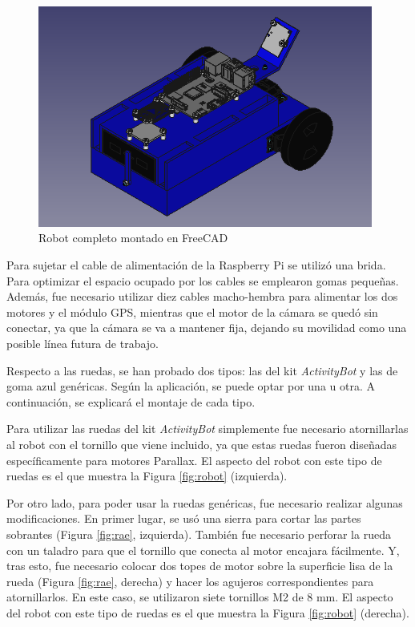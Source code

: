 \begin{figure} [h!]
	\begin{center}
		\includegraphics[width=11cm]{figs/cap5/completo3.png}
	\end{center}
	\caption{Robot completo montado en FreeCAD} 
	\label{fig:robotfreecad}
\end{figure}


Para sujetar el cable de alimentación de la Raspberry Pi se utilizó una brida. Para optimizar el espacio ocupado por los cables se emplearon gomas pequeñas. Además, fue necesario utilizar diez cables macho-hembra para alimentar los dos motores y el módulo GPS, mientras que el motor de la cámara se quedó sin conectar, ya que la cámara se va a mantener fija, dejando su movilidad como una posible línea futura de trabajo.

Respecto a las ruedas, se han probado dos tipos: las del kit \textit{ActivityBot} y las de goma azul genéricas. Según la aplicación, se puede optar por una u otra. A continuación, se explicará el montaje de cada tipo.

Para utilizar las ruedas del kit \textit{ActivityBot} simplemente fue necesario atornillarlas al robot con el tornillo que viene incluido, ya que estas ruedas fueron diseñadas específicamente para motores Parallax. El aspecto del robot con este tipo de ruedas es el que muestra la Figura \ref{fig:robot} (izquierda).


Por otro lado, para poder usar la ruedas genéricas, fue necesario realizar algunas modificaciones. En primer lugar, se usó una sierra para cortar las partes sobrantes (Figura \ref{fig:rae}, izquierda). También fue necesario perforar la rueda con un taladro para que el tornillo que conecta al motor encajara fácilmente. Y, tras esto, fue necesario colocar dos topes de motor sobre la superficie lisa de la rueda (Figura \ref{fig:rae}, derecha) y hacer los agujeros correspondientes para atornillarlos. En este caso, se utilizaron siete tornillos M2 de 8 mm. El aspecto del robot con este tipo de ruedas es el que muestra la Figura \ref{fig:robot} (derecha).

